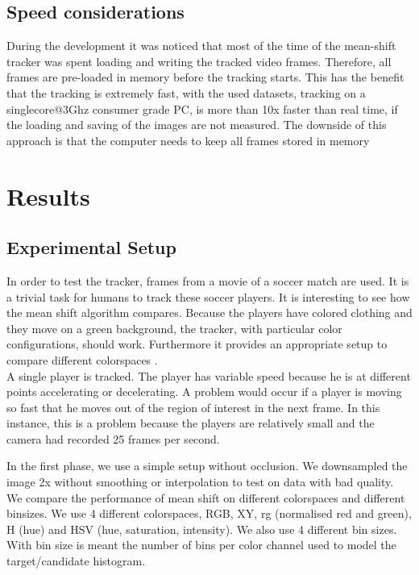 \documentclass[a4paper,11pt]{article}
\begin{document}
\subsection{Speed considerations}
During the development it was noticed that most of the time of the mean-shift tracker was spent loading and writing the tracked video frames. Therefore, all frames are pre-loaded in memory before the tracking starts. This has the benefit that the tracking is extremely fast, with the used datasets, tracking on a singlecore@3Ghz consumer grade PC, is more than 10x faster than real time, if the loading and saving of the images are not measured. The downside of this approach is that the computer needs to keep all frames stored in memory 





\section{Results} 

	\subsection{Experimental Setup} 
	In order to test the tracker, frames from a movie of a soccer match are
	used.  It is a trivial task for humans to track these soccer players. It is
	interesting to see how the mean shift algorithm compares.  Because the
	players have colored clothing and they move on a green background, the
	tracker, with particular color configurations, should work. Furthermore it
	provides an appropriate setup to compare different colorspaces .\\

	A single player is tracked. The player has variable speed because he is at
	different points accelerating or decelerating. A problem would occur if a
	player is moving so fast that he moves out of the region of interest in the
	next frame. In this instance, this is a problem because the players are
	relatively small and the camera had recorded 25 frames per second.
	
	In the first phase, we use a simple setup without occlusion. We downsampled
	the image 2x without smoothing or interpolation to test on data with bad
	quality.  We compare the performance of mean shift on different colorspaces
	and different binsizes.  We use 4 different colorspaces, RGB, XY, rg
	(normalised red and green), H (hue) and HSV (hue, saturation, intensity). We
	also use 4 different bin sizes. With bin size is meant the number of bins
	per color channel used to model the target/candidate histogram.
\end{document}
